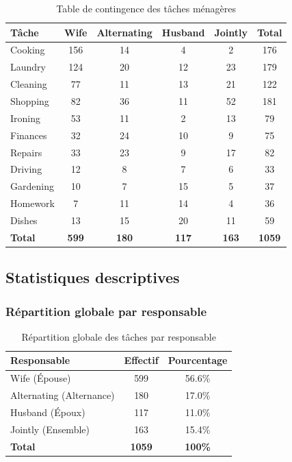 \documentclass[12pt,a4paper]{article}
\begin{document}
\begin{table}[H]
\centering
\caption{Table de contingence des tâches ménagères}
\begin{tabular}{|l|c|c|c|c|c|}
\hline
\textbf{Tâche} & \textbf{Wife} & \textbf{Alternating} & \textbf{Husband} & \textbf{Jointly} & \textbf{Total} \\
\hline
Cooking & 156 & 14 & 4 & 2 & 176 \\
Laundry & 124 & 20 & 12 & 23 & 179 \\
Cleaning & 77 & 11 & 13 & 21 & 122 \\
Shopping & 82 & 36 & 11 & 52 & 181 \\
Ironing & 53 & 11 & 2 & 13 & 79 \\
Finances & 32 & 24 & 10 & 9 & 75 \\
Repairs & 33 & 23 & 9 & 17 & 82 \\
Driving & 12 & 8 & 7 & 6 & 33 \\
Gardening & 10 & 7 & 15 & 5 & 37 \\
Homework & 7 & 11 & 14 & 4 & 36 \\
Dishes & 13 & 15 & 20 & 11 & 59 \\
\hline
\textbf{Total} & \textbf{599} & \textbf{180} & \textbf{117} & \textbf{163} & \textbf{1059} \\
\hline
\end{tabular}
\end{table}

\subsection{Statistiques descriptives}

\subsubsection{Répartition globale par responsable}

\begin{table}[H]
\centering
\caption{Répartition globale des tâches par responsable}
\begin{tabular}{|l|c|c|}
\hline
\textbf{Responsable} & \textbf{Effectif} & \textbf{Pourcentage} \\
\hline
Wife (Épouse) & 599 & 56.6\% \\
Alternating (Alternance) & 180 & 17.0\% \\
Husband (Époux) & 117 & 11.0\% \\
Jointly (Ensemble) & 163 & 15.4\% \\
\hline
\textbf{Total} & \textbf{1059} & \textbf{100\%} \\
\hline
\end{tabular}
\end{table}
\end{document}
